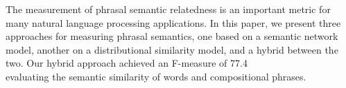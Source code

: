 The measurement of phrasal semantic relatedness is an important metric for many natural language processing applications. In this paper, we present three
 approaches for measuring phrasal semantics, one based on a semantic network
 model, another on a distributional similarity model, and a hybrid between the
 two. Our hybrid approach achieved an F-measure of 77.4\\%
 evaluating the semantic similarity of words and compositional phrases.

